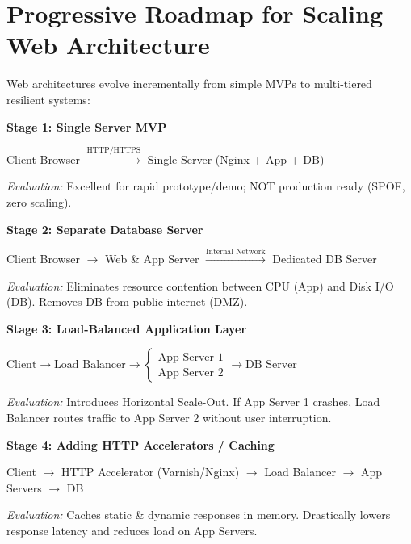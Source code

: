 ﻿\documentclass[8pt, a4paper]{article}
\begin{document}
\section{Progressive Roadmap for Scaling Web Architecture}

Web architectures evolve incrementally from simple MVPs to multi-tiered resilient systems:

\begin{conceptbox}
\textbf{Stage 1: Single Server MVP}

\smallskip
Client Browser $\xrightarrow{\text{HTTP/HTTPS}}$ Single Server (Nginx + App + DB)

\smallskip
\textit{Evaluation:} Excellent for rapid prototype/demo; NOT production ready (SPOF, zero scaling).
\end{conceptbox}

\begin{conceptbox}
\textbf{Stage 2: Separate Database Server}

\smallskip
Client Browser $\to$ Web \& App Server $\xrightarrow{\text{Internal Network}}$ Dedicated DB Server

\smallskip
\textit{Evaluation:} Eliminates resource contention between CPU (App) and Disk I/O (DB). Removes DB from public internet (DMZ).
\end{conceptbox}

\begin{conceptbox}
\textbf{Stage 3: Load-Balanced Application Layer}

\smallskip
$\text{Client} \to \text{Load Balancer} \to
\begin{cases}
  \text{App Server 1} \\
  \text{App Server 2}
\end{cases}
\to \text{DB Server}$

\smallskip
\textit{Evaluation:} Introduces Horizontal Scale-Out. If App Server 1 crashes, Load Balancer routes traffic to App Server 2 without user interruption.
\end{conceptbox}

\begin{conceptbox}
\textbf{Stage 4: Adding HTTP Accelerators / Caching}

\smallskip
Client $\to$ HTTP Accelerator (Varnish/Nginx) $\to$ Load Balancer $\to$ App Servers $\to$ DB

\smallskip
\textit{Evaluation:} Caches static \& dynamic responses in memory. Drastically lowers response latency and reduces load on App Servers.
\end{conceptbox}
\end{document}
